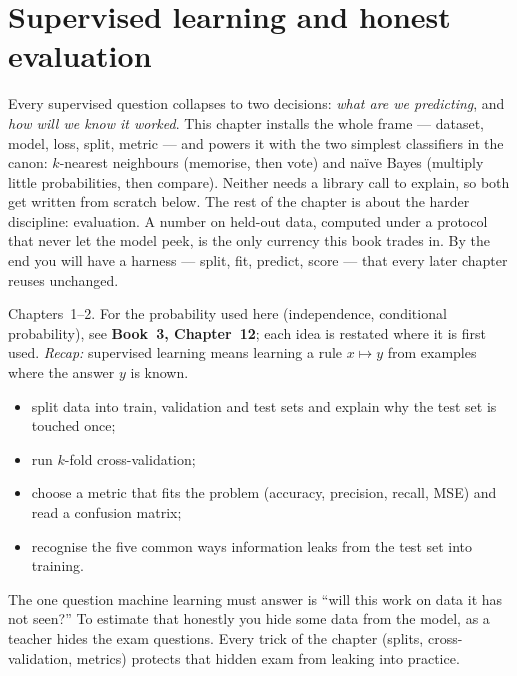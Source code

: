 \chapter{Supervised learning and honest evaluation}\label{ch:eval}

Every supervised question collapses to two decisions: \emph{what are we
predicting}, and \emph{how will we know it worked}. This chapter installs the
whole frame --- dataset, model, loss, split, metric --- and powers it with the
two simplest classifiers in the canon: $k$-nearest neighbours (memorise, then vote) and na\"ive Bayes
(multiply little probabilities, then compare). Neither needs a library call to
explain, so both get written from scratch below. The rest of the chapter is
about the harder discipline: evaluation. A number on held-out data, computed
under a protocol that never let the model peek, is the only currency this
book trades in. By the end you will have a harness --- split, fit, predict,
score --- that every later chapter reuses unchanged.

\begin{rulebox}
Chapters~1--2. For the probability used here (independence, conditional probability), see \textbf{Book~3, Chapter~12}; each idea is restated where it is first used. \emph{Recap:} supervised learning means learning a rule $x\mapsto y$ from examples where the answer $y$ is known.
\end{rulebox}
\begin{wins}
\begin{itemize}
\item split data into train, validation and test sets and explain why the test set is touched once;
\item run $k$-fold cross-validation;
\item choose a metric that fits the problem (accuracy, precision, recall, MSE) and read a confusion matrix;
\item recognise the five common ways information leaks from the test set into training.
\end{itemize}
\end{wins}
\begin{principle}
The one question machine learning must answer is ``will this work on data it has not seen?'' To estimate that honestly you hide some data from the model, as a teacher hides the exam questions. Every trick of the chapter (splits, cross-validation, metrics) protects that hidden exam from leaking into practice.
\end{principle}

